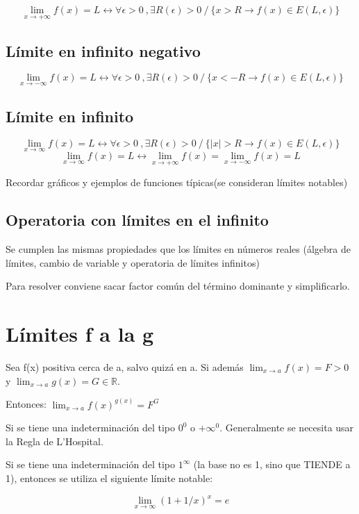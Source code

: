 \documentclass{report}
\begin{document}
			$$\lim_{x \to +\infty}f(x) = L \leftrightarrow \forall \epsilon > 0 \ , \exists R(\epsilon)>0 \ / \ \{x>R \rightarrow f(x) \in E(L,\epsilon)\}$$
		
		\subsection{Límite en infinito negativo}
		
			$$\lim_{x \to -\infty}f(x) = L \leftrightarrow \forall \epsilon > 0 \ , \exists R(\epsilon)>0 \ / \ \{x<-R \rightarrow f(x) \in E(L,\epsilon)\}$$
			
		\subsection{Límite en infinito}
			$$\lim_{x \to \infty}f(x) = L \leftrightarrow \forall \epsilon > 0 \ , \exists R(\epsilon)>0 \ / \ \{|x|>R \rightarrow f(x) \in E(L,\epsilon)\}$$
			$$\lim_{x \to \infty}f(x) = L \leftrightarrow \lim_{x \to +\infty}f(x) = \lim_{x \to -\infty}f(x) = L$$
			
			Recordar gráficos y ejemplos de funciones típicas(se consideran límites notables)
			
		\subsection{Operatoria con límites en el infinito}
			Se cumplen las mismas propiedades que los límites en números reales (álgebra de límites, cambio de variable y operatoria de límites infinitos)
			
			Para resolver conviene sacar factor común del término dominante y simplificarlo.
			
	\section{Límites f a la g}
		Sea f(x) positiva cerca de a, salvo quizá en a. 
		Si además $\lim_{x \to a}f(x)=F > 0$ y $\lim_{x \to a}g(x)=G \in \mathbb{R}$.
		
		Entonces: $\lim_{x \to a}f(x)^{g(x)}=F^G$
		
		Si se tiene una indeterminación del tipo $0^0$ o $+\infty^0$. Generalmente se necesita usar la Regla de L'Hospital.
		
		Si se tiene una indeterminación del tipo $1^\infty$ (la base no es 1, sino que TIENDE a 1), entonces se utiliza el siguiente límite notable:
		
		$$\lim_{x \to \infty} (1+1/x)^x = e$$
		
\end{document}
